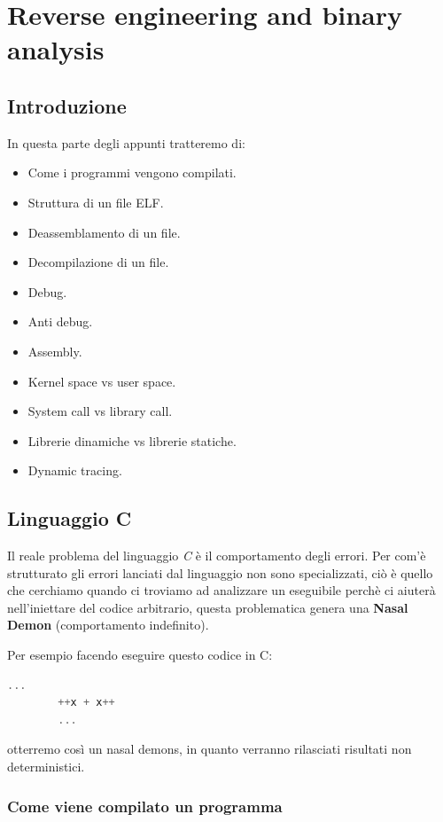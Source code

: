 \chapter{Reverse engineering and binary analysis}

\section{Introduzione}
In questa parte degli appunti tratteremo di:
\begin{itemize}
    \item Come i programmi vengono compilati.
    \item Struttura di un file ELF.
    \item Deassemblamento di un file.
    \item Decompilazione di un file.
    \item Debug.
    \item Anti debug.
    \item Assembly.
    \item Kernel space vs user space.
    \item System call vs library call.
    \item Librerie dinamiche vs librerie statiche.
    \item Dynamic tracing.
\end{itemize}

\section{Linguaggio C}
Il reale problema del linguaggio \textit{C} è il comportamento degli errori. Per com'è strutturato gli errori lanciati dal linguaggio non sono specializzati, ciò è quello che cerchiamo quando ci troviamo ad analizzare un eseguibile perchè ci aiuterà nell'iniettare del codice arbitrario, questa problematica genera una \textbf{Nasal Demon} (comportamento indefinito).

\begin{ex}
    Per esempio facendo eseguire questo codice in C:
    \begin{lstlisting}[language=C]
        ...
        ++x + x++
        ...
    \end{lstlisting}
    otterremo così un nasal demons, in quanto verranno rilasciati risultati non deterministici.
\end{ex}

\subsection{Come viene compilato un programma}

